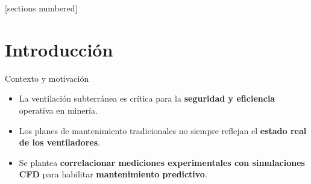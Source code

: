 [sections numbered]


\begin{frame}[plain]
  \titlepage
\end{frame}


\section{Introducción}
\begin{frame}{Contexto y motivación}
    \begin{itemize}
      \item La ventilación subterránea es crítica para la \textbf{seguridad y eficiencia} operativa en minería.\\[0.2cm]
      \item Los planes de mantenimiento tradicionales no siempre reflejan el \textbf{estado real de los ventiladores}.\\[0.2cm]
      \item Se plantea \textbf{correlacionar mediciones experimentales con simulaciones CFD} para habilitar \textbf{mantenimiento predictivo}.
    \end{itemize}
\end{frame}

